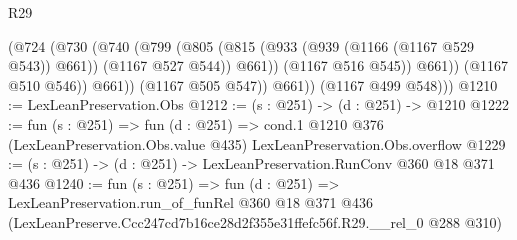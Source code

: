 \begin{lexlean}{R29}
\begin{coremodule}
                    (@724
                      (@730
                        (@740
                          (@799
                            (@805
                              (@815 (@933 (@939 (@1166 (@1167 @529 @543)) @661)) (@1167 @527 @544))
                              @661))
                          (@1167 @516 @545))
                        @661))
                    (@1167 @510 @546))
                  @661))
              (@1167 @505 @547))
            @661))
        (@1167 @499 @548)))
@1210 := LexLeanPreservation.Obs
@1212 := (s : @251) -> (d : @251) -> @1210
@1222 := fun (s : @251) =>
  fun (d : @251) =>
  cond.{1} @1210 @376 (LexLeanPreservation.Obs.value @435) LexLeanPreservation.Obs.overflow
@1229 := (s : @251) -> (d : @251) -> LexLeanPreservation.RunConv @360 @18 @371 @436
@1240 := fun (s : @251) =>
  fun (d : @251) =>
  LexLeanPreservation.run_of_funRel
    @360
    @18
    @371
    @436
    (LexLeanPreserve.Ccc247cd7b16ce28d2f355e31ffefc56f.R29.__rel_0 @288 @310)
\end{coremodule}
\end{lexlean}
